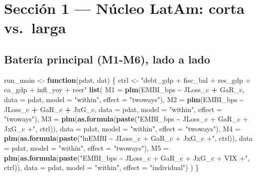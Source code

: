 \documentclass[
]{article}
\newenvironment{Shaded}{\begin{snugshade}}{\end{snugshade}}
\newcommand{\AttributeTok}[1]{\textcolor[rgb]{0.13,0.29,0.53}{#1}}
\newcommand{\ControlFlowTok}[1]{\textcolor[rgb]{0.13,0.29,0.53}{\textbf{#1}}}
\newcommand{\FunctionTok}[1]{\textcolor[rgb]{0.13,0.29,0.53}{\textbf{#1}}}
\newcommand{\NormalTok}[1]{#1}
\newcommand{\OtherTok}[1]{\textcolor[rgb]{0.56,0.35,0.01}{#1}}
\newcommand{\SpecialCharTok}[1]{\textcolor[rgb]{0.81,0.36,0.00}{\textbf{#1}}}
\newcommand{\StringTok}[1]{\textcolor[rgb]{0.31,0.60,0.02}{#1}}
\begin{document}
\section{Sección 1 --- Núcleo LatAm: corta
vs.~larga}\label{secciuxf3n-1-nuxfacleo-latam-corta-vs.-larga}

\subsection{Batería principal (M1-M6), lado a
lado}\label{bateruxeda-principal-m1-m6-lado-a-lado}

\begin{Shaded}
\begin{Highlighting}[]
\NormalTok{run\_main }\OtherTok{\textless{}{-}} \ControlFlowTok{function}\NormalTok{(pdat, dat) \{}
\NormalTok{  ctrl }\OtherTok{\textless{}{-}} \StringTok{"debt\_gdp + fisc\_bal + res\_gdp + ca\_gdp + infl\_yoy + reer"}
  \FunctionTok{list}\NormalTok{(}
    \AttributeTok{M1 =} \FunctionTok{plm}\NormalTok{(EMBI\_bps }\SpecialCharTok{\textasciitilde{}}\NormalTok{ JLoss\_c }\SpecialCharTok{+}\NormalTok{ GaR\_c, }\AttributeTok{data =}\NormalTok{ pdat, }\AttributeTok{model =} \StringTok{"within"}\NormalTok{, }\AttributeTok{effect =} \StringTok{"twoways"}\NormalTok{),}
    \AttributeTok{M2 =} \FunctionTok{plm}\NormalTok{(EMBI\_bps }\SpecialCharTok{\textasciitilde{}}\NormalTok{ JLoss\_c }\SpecialCharTok{+}\NormalTok{ GaR\_c }\SpecialCharTok{+}\NormalTok{ JxG\_c, }\AttributeTok{data =}\NormalTok{ pdat, }\AttributeTok{model =} \StringTok{"within"}\NormalTok{, }\AttributeTok{effect =} \StringTok{"twoways"}\NormalTok{),}
    \AttributeTok{M3 =} \FunctionTok{plm}\NormalTok{(}\FunctionTok{as.formula}\NormalTok{(}\FunctionTok{paste}\NormalTok{(}\StringTok{"EMBI\_bps \textasciitilde{} JLoss\_c + GaR\_c + JxG\_c +"}\NormalTok{, ctrl)),}
             \AttributeTok{data =}\NormalTok{ pdat, }\AttributeTok{model =} \StringTok{"within"}\NormalTok{, }\AttributeTok{effect =} \StringTok{"twoways"}\NormalTok{),}
    \AttributeTok{M4 =} \FunctionTok{plm}\NormalTok{(}\FunctionTok{as.formula}\NormalTok{(}\FunctionTok{paste}\NormalTok{(}\StringTok{"lnEMBI \textasciitilde{} JLoss\_c + GaR\_c + JxG\_c +"}\NormalTok{, ctrl)),}
             \AttributeTok{data =}\NormalTok{ pdat, }\AttributeTok{model =} \StringTok{"within"}\NormalTok{, }\AttributeTok{effect =} \StringTok{"twoways"}\NormalTok{),}
    \AttributeTok{M5 =} \FunctionTok{plm}\NormalTok{(}\FunctionTok{as.formula}\NormalTok{(}\FunctionTok{paste}\NormalTok{(}\StringTok{"EMBI\_bps \textasciitilde{} JLoss\_c + GaR\_c + JxG\_c + VIX +"}\NormalTok{, ctrl)),}
             \AttributeTok{data =}\NormalTok{ pdat, }\AttributeTok{model =} \StringTok{"within"}\NormalTok{, }\AttributeTok{effect =} \StringTok{"individual"}\NormalTok{)}
\NormalTok{  )}
\NormalTok{\}}


\end{Highlighting}
\end{Shaded}
\end{document}
